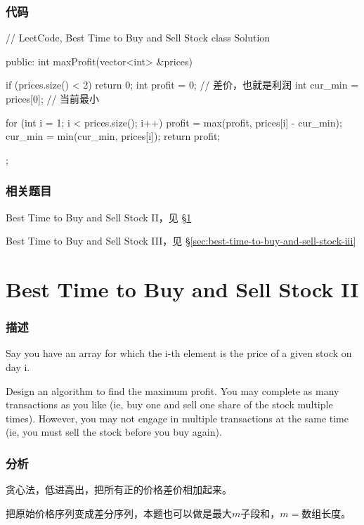 \subsubsection{代码}
\begin{Code}
// LeetCode, Best Time to Buy and Sell Stock
class Solution {
public:
    int maxProfit(vector<int> &prices) {
        if (prices.size() < 2) return 0;
        int profit = 0;  // 差价，也就是利润
        int cur_min = prices[0]; // 当前最小

        for (int i = 1; i < prices.size(); i++) {
            profit = max(profit, prices[i] - cur_min);
            cur_min = min(cur_min, prices[i]);
        }
        return profit;
    }
};
\end{Code}


\subsubsection{相关题目}
\begindot
\item Best Time to Buy and Sell Stock II，见 \S \ref{sec:best-time-to-buy-and-sell-stock-ii}
\item Best Time to Buy and Sell Stock III，见 \S \ref{sec:best-time-to-buy-and-sell-stock-iii}
\myenddot


\section{Best Time to Buy and Sell Stock II} %
\label{sec:best-time-to-buy-and-sell-stock-ii}


\subsubsection{描述}
Say you have an array for which the i-th element is the price of a given stock on day i.

Design an algorithm to find the maximum profit. You may complete as many transactions as you like (ie, buy one and sell one share of the stock multiple times). However, you may not engage in multiple transactions at the same time (ie, you must sell the stock before you buy again).


\subsubsection{分析}
贪心法，低进高出，把所有正的价格差价相加起来。

把原始价格序列变成差分序列，本题也可以做是最大$m$子段和，$m=$数组长度。

